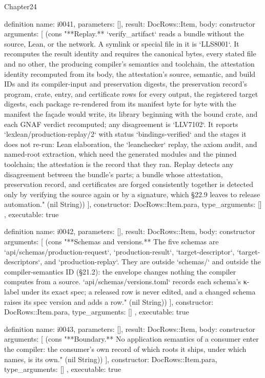 \begin{lexlean}{Chapter24}
\begin{semanticmodule}
definition{
  name: i0041,
  parameters: [],
  result: DocRows::Item,
  body: constructor{
    arguments: [
      (cons "**Replay.** `verify_artifact` reads a bundle without the source, Lean, or the network. A symlink or special file in it is `LLS8001`. It recomputes the result identity and requires the canonical bytes, every stated file and no other, the producing compiler's semantics and toolchain, the attestation identity recomputed from its body, the attestation's source, semantic, and build IDs and its compiler-input and preservation digests, the preservation record's program, crate, entry, and certificate rows for every output, the registered target digests, each package re-rendered from its manifest byte for byte with the manifest the façade would write, its library beginning with the bound crate, and each GNAF verdict recomputed; any disagreement is `LLV7102`. It reports `lexlean/production-replay/2` with status `bindings-verified` and the stages it does not re-run: Lean elaboration, the `leanchecker` replay, the axiom audit, and named-root extraction, which need the generated modules and the pinned toolchain; the attestation is the record that they ran. Replay detects any disagreement between the bundle's parts; a bundle whose attestation, preservation record, and certificates are forged consistently together is detected only by verifying the source again or by a signature, which §22.9 leaves to release automation." (nil String))
    ],
    constructor: DocRows::Item.para,
    type_arguments: []
  },
  executable: true
}

definition{
  name: i0042,
  parameters: [],
  result: DocRows::Item,
  body: constructor{
    arguments: [
      (cons "**Schemas and versions.** The five schemas are `api/schemas/production-request`, `production-result`, `target-descriptor`, `target-descriptors`, and `production-replay`. They are outside `schemas/` and outside the compiler-semantics ID (§21.2): the envelope changes nothing the compiler computes from a source. `api/schemas/versions.toml` records each schema's κ-label under its exact spec; a released row is never edited, and a changed schema raises its spec version and adds a row." (nil String))
    ],
    constructor: DocRows::Item.para,
    type_arguments: []
  },
  executable: true
}

definition{
  name: i0043,
  parameters: [],
  result: DocRows::Item,
  body: constructor{
    arguments: [
      (cons "**Boundary.** No application semantics of a consumer enter the compiler: the consumer's own record of which roots it ships, under which names, is its own." (nil String))
    ],
    constructor: DocRows::Item.para,
    type_arguments: []
  },
  executable: true
}


\end{semanticmodule}
\end{lexlean}
